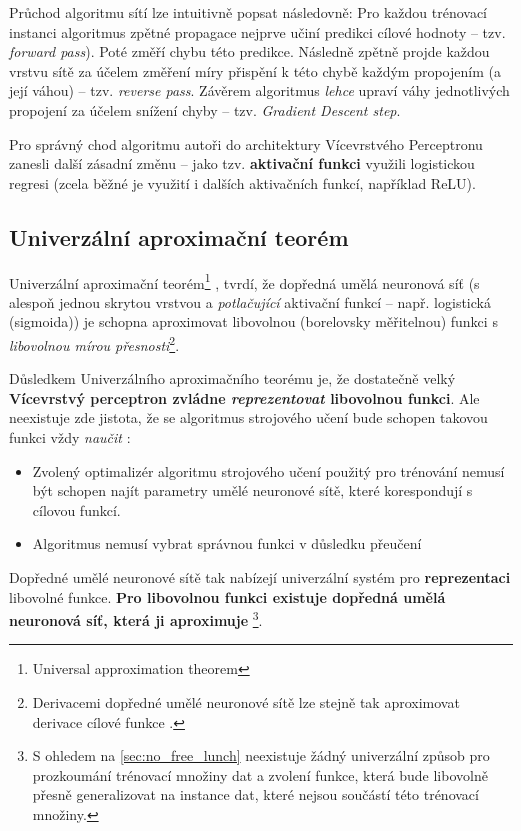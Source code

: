 Průchod algoritmu sítí lze intuitivně popsat následovně: Pro každou trénovací instanci algoritmus zpětné propagace nejprve učiní predikci cílové hodnoty – tzv. \emph{forward pass}).
Poté změří chybu této predikce. Následně zpětně projde každou vrstvu sítě za účelem změření míry přispění k této chybě každým propojením (a její váhou) – tzv. \emph{reverse pass}.
Závěrem algoritmus \emph{lehce} upraví váhy jednotlivých propojení za účelem snížení chyby – tzv. \emph{Gradient Descent step}. \cite{Geron2019}

Pro správný chod algoritmu autoři \cite{Rumelhart1987} do architektury Vícevrstvého Perceptronu zanesli další zásadní změnu – jako tzv. \textbf{aktivační funkci} využili logistickou regresi (zcela běžné je využití i dalších aktivačních funkcí, například ReLU).

\subsection{Univerzální aproximační teorém}
\label{sec:universal_approximation_theorem}
Univerzální aproximační teorém\footnote{Universal approximation theorem} \cite{Hornik1989}, \cite{Cybenko1989} tvrdí, že dopředná umělá neuronová síť (s alespoň jednou skrytou vrstvou a \emph{potlačující} aktivační funkcí – např. logistická (sigmoida)) je schopna aproximovat libovolnou (borelovsky měřitelnou) funkci s \emph{libovolnou mírou přesnosti}\footnote{Derivacemi dopředné umělé neuronové sítě lze stejně tak aproximovat derivace cílové funkce \cite{Hornik1990}.}.

Důsledkem Univerzálního aproximačního teorému je, že dostatečně velký \textbf{Vícevrstvý perceptron zvládne \emph{reprezentovat} libovolnou funkci}.
Ale neexistuje zde jistota, že se algoritmus strojového učení bude schopen takovou funkci vždy \emph{naučit}  \cite{Goodfellow2016}:

\begin{itemize}
    \item Zvolený optimalizér algoritmu strojového učení použitý pro trénování nemusí být schopen najít parametry umělé neuronové sítě, které korespondují s cílovou funkcí.
    \item Algoritmus nemusí vybrat správnou funkci v důsledku přeučení
\end{itemize}

Dopředné umělé neuronové sítě tak nabízejí univerzální systém pro \textbf{reprezentaci} libovolné funkce. \textbf{Pro libovolnou funkci existuje dopředná umělá neuronová síť, která ji aproximuje}
\footnote{S ohledem na \autoref{sec:no_free_lunch} neexistuje žádný univerzální způsob pro prozkoumání trénovací množiny dat a zvolení funkce, která bude libovolně přesně generalizovat na instance dat, které nejsou součástí této trénovací množiny.}.
